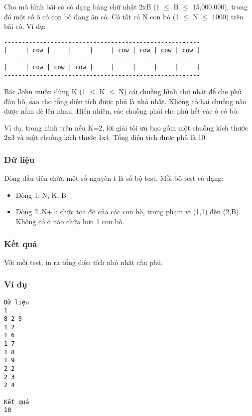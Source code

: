 



   Cho mô hình bãi cỏ có dạng bảng chữ nhật 2xB (1  $\le$  B  $\le$  15,000,000), trong đó một số ô có con bò đang ăn cỏ. Có tất cả N con bò (1  $\le$  N  $\le$  1000) trên bãi cỏ. Ví dụ:  
\begin{verbatim}
-------------------------------------------------------
|     | cow |     |     |     | cow | cow | cow | cow |
-------------------------------------------------------
|     | cow | cow | cow |     |     |     |     |     |
-------------------------------------------------------
\end{verbatim}

   Bác John muốn dùng K (1  $\le$  K  $\le$  N) cái chuồng hình chữ nhật để che phủ đàn bò, sao cho tổng diện tích được phủ là nhỏ nhất. Không có hai chuồng nào được nằm đè lên nhau. Hiển nhiên, các chuồng phải che phủ hết các ô có bò.  

   Ví dụ, trong hình trên nếu K=2, lời giải tối ưu bao gồm một chuồng kích thước 2x3 và một chuồng kích thước 1x4. Tổng diện tích được phủ là 10.  

\subsubsection{   Dữ liệu  }

   Dòng đầu tiên chứa một số nguyên t là số bộ test. Mỗi bộ test có dạng:  
\begin{itemize}
	\item     Dòng 1: N, K, B   
	\item     Dòng 2..N+1: chức tọa độ của các con bò, trong phạm vi (1,1) đến (2,B). Không có ô nào chứa hơn 1 con bò.   
\end{itemize}

\subsubsection{   Kết quả  }

   Với mỗi test, in ra tổng diện tích nhỏ nhất cần phủ.  

\subsubsection{   Ví dụ  }
\begin{verbatim}
Dữ liệu
1
8 2 9
1 2
1 6
1 7
1 8
1 9
2 2
2 3
2 4

Kết quả
10
\end{verbatim}
